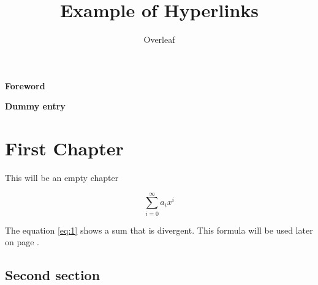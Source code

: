 \documentclass{book}
\title{Example of Hyperlinks}
\author{Overleaf}
\begin{document}
	
	\frontmatter
	\tableofcontents
	\clearpage
	
	{\huge {\bf Foreword}}
	
	\Blindtext
	\clearpage
	
	{\huge {\bf Dummy entry}}
	
	\Blindtext
	\mainmatter
	
	\chapter{First Chapter}
	
	This will be an empty chapter
	
	\begin{equation}
		\label{eq:1}
		\sum_{i=0}^{\infty} a_i x^i
	\end{equation}
	
	The equation \ref{eq:1} shows a sum that is divergent. This formula will be used later on page \pageref{second}.
	
	\Blindtext
	\clearpage
	
	\section{Second section} \label{second}
	
	\blindtext
	\Blinddocument
\end{document}
